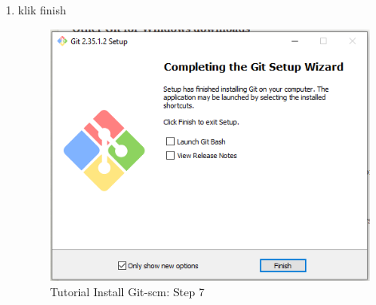 \begin{enumerate}
\item klik finish
\begin{figure}[H]
        \centerline{\includegraphics[scale=0.5]{figures/instalasi-git-scm-windows/step7}}
        \caption{Tutorial Install Git-scm: Step 7}
\end{figure}
\end{enumerate}

